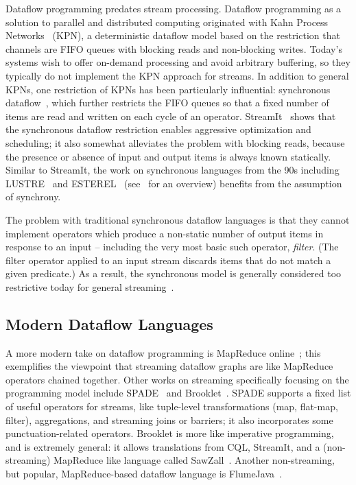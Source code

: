 Dataflow programming predates stream processing.
Dataflow programming as a solution to parallel and distributed computing
originated with Kahn Process Networks~\cite{gilles1974semantics} (KPN), a deterministic dataflow model based on the restriction that channels are FIFO queues with blocking reads and non-blocking writes. Today's systems wish to offer on-demand processing and avoid arbitrary buffering, so they typically do not implement the KPN approach for streams.
In addition to general KPNs, one restriction of KPNs has been particularly influential: synchronous dataflow~\cite{lee1987synchronous}, which further restricts the FIFO queues so that a fixed number of items are read and written on each cycle of an operator. StreamIt~\cite{thies2002streamit} shows that the synchronous dataflow restriction enables aggressive optimization and scheduling; it also somewhat alleviates the problem with blocking reads, because the presence or absence of input and output items is always known statically.
Similar to StreamIt,
the work on synchronous languages from the 90s including LUSTRE~\cite{halbwachs1991synchronous} and ESTEREL~\cite{berry1992esterel} (see~\cite{BCEHlGdS2003SL} for an overview) benefits from the assumption of
synchrony.

The problem with traditional synchronous dataflow languages is that they cannot implement operators which produce a non-static number of output items in response to an input -- including the very most basic such operator, \emph{filter}. (The filter operator applied to an input stream discards items that do not match a given predicate.) As a result, the synchronous model is generally considered too restrictive today for general streaming~\cite{schneider2013safe}.

\subsection{Modern Dataflow Languages}

A more modern take on dataflow programming is MapReduce online~\cite{condie2010mapreduce}; this exemplifies the viewpoint that streaming dataflow graphs are like MapReduce operators chained together.
Other works on streaming specifically focusing on the programming model include SPADE~\cite{gedik2008spade} and Brooklet~\cite{soule2010universal}.
SPADE supports a fixed list of useful operators for streams, like tuple-level transformations (map, flat-map, filter), aggregations, and streaming joins or barriers; it also incorporates some punctuation-related operators.
Brooklet is more like imperative programming,
and is extremely general: it allows translations from CQL, StreamIt, and a (non-streaming) MapReduce like language called SawZall~\cite{pike2005interpreting}.
Another non-streaming, but popular, MapReduce-based dataflow language
is FlumeJava~\cite{chambers2010flumejava}.

